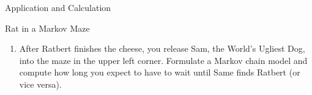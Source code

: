 \documentclass[12pt]{article}
\newcommand{\matindex}[1]{\mbox{\scriptsize#1}}
\newcommand\scalemath[2]{\scalebox{#1}{\mbox{\ensuremath{\displaystyle #2}}}}
\numberwithin{equation}{section}
\begin{document}
\begin{section}{Application and Calculation}
\begin{subsection}{Rat in a Markov Maze}
\begin{enumerate}
\[{\begin{blockarray}{cccc}
\begin{block}{c[ccc]}
        \matindex{(3,1)}&0&0&0\\
        \matindex{(3,2)}&0&0&0\\
        \matindex{(3,3)}&0&0&p/2\\
        \matindex{(4,1)}&0&0&0\\
        \matindex{(4,2)}&0&0&0\\
        \matindex{(4,4)}&0&p/2&p/2\\
        \end{block}
        \end{blockarray}.}\]

        We can then attempt to invert $I-Q$ and multiply by $S$. We can do this in Mathematica (see attached) to get the matrix product:
        \[\scalemath{0.75}{(I-Q)^{-1}S=\begin{blockarray}{cccc}
        &\matindex{(1,2)}&\matindex{(3,4)}&\matindex{(4,3)}\\
        \begin{block}{c[ccc]}
        \matindex{(1,1)}&8/9&1/18&1/18\\
        \matindex{(1,3)}&5/9&2/9&2/9\\
        \matindex{(1,4)}&5/9&2/9&2/9\\
        \matindex{(2,1)}&7/9&1/9&1/9\\
        \matindex{(2,2)}&4/9&5/18&5/18\\
        \matindex{(2,3)}&1/3&1/3&1/3\\
        \matindex{(2,4)}&1/6&2/3&1/6\\
        \matindex{(3,1)}&2/3&1/6&1/6\\
        \matindex{(3,2)}&5/9&2/9&2/9\\
        \matindex{(3,3)}&1/6&1/6&2/3\\
        \matindex{(4,1)}&2/3&1/6&1/6\\
        \matindex{(4,2)}&2/3&1/6&1/6\\
        \matindex{(4,4)}&0&1/2&1/2\\
        \end{block}
        \end{blockarray}.}\]

        Since we are only interested in the case where Ratbert starts at $(4,1)$ we have the probability that Ratbert reaches the cheese at state $(3,4)$ without getting shocked to be $\frac{1}{6}$ corresponding to the entry $(I-Q)^{-1}S_{(4,1),(3,4)}$.

        \item After Ratbert finishes the cheese, you release Sam, the World's Ugliest Dog, into the maze in the upper left corner. Formulate a Markov chain model and compute how long you expect to have to wait until Same finds Ratbert (or vice versa).\\


\end{enumerate}
\end{subsection}
\end{section}
\end{document}
